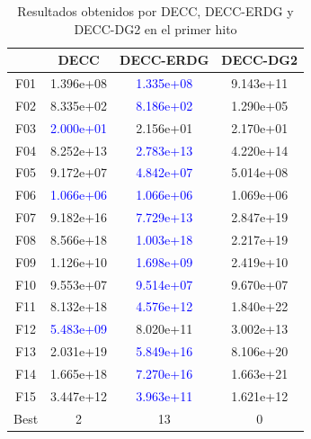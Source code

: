 \begin{table}[h]
\centering
\begin{tabular}{cccc}
\toprule
{} &       DECC &  DECC-ERDG &   DECC-DG2 \\
\midrule
F01  &  1.396e+08 &  \textcolor{blue}{1.335e+08} &  9.143e+11 \\
F02  &  8.335e+02 &  \textcolor{blue}{8.186e+02} &  1.290e+05 \\
F03  &  \textcolor{blue}{2.000e+01} &  2.156e+01 &  2.170e+01 \\
F04  &  8.252e+13 &  \textcolor{blue}{2.783e+13} &  4.220e+14 \\
F05  &  9.172e+07 &  \textcolor{blue}{4.842e+07} &  5.014e+08 \\
F06  &  \textcolor{blue}{1.066e+06} &  \textcolor{blue}{1.066e+06} &  1.069e+06 \\
F07  &  9.182e+16 &  \textcolor{blue}{7.729e+13} &  2.847e+19 \\
F08  &  8.566e+18 &  \textcolor{blue}{1.003e+18} &  2.217e+19 \\
F09  &  1.126e+10 &  \textcolor{blue}{1.698e+09} &  2.419e+10 \\
F10  &  9.553e+07 &  \textcolor{blue}{9.514e+07} &  9.670e+07 \\
F11  &  8.132e+18 &  \textcolor{blue}{4.576e+12} &  1.840e+22 \\
F12  &  \textcolor{blue}{5.483e+09} &  8.020e+11 &  3.002e+13 \\
F13  &  2.031e+19 &  \textcolor{blue}{5.849e+16} &  8.106e+20 \\
F14  &  1.665e+18 &  \textcolor{blue}{7.270e+16} &  1.663e+21 \\
F15  &  3.447e+12 &  \textcolor{blue}{3.963e+11} &  1.621e+12 \\
Best &          2 &         13 &          0 \\
\bottomrule
\end{tabular}
\caption{Resultados obtenidos por DECC, DECC-ERDG y DECC-DG2 en el primer hito}
\label{tab:resultados_DECC_1}
\end{table}

